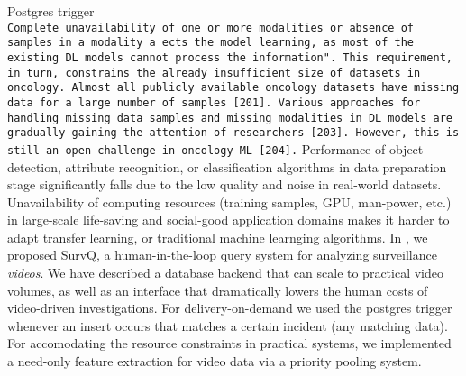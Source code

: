Postgres trigger \\
\texttt{Complete unavailability of one or more modalities or absence of samples in a modality a ects the model learning, as most of the existing DL models cannot process the \missing information". This requirement, in turn, constrains the already insufficient size of datasets in oncology. Almost all publicly available oncology datasets have missing data for a large number of samples [201]. Various approaches for handling missing data samples and missing modalities in DL models are gradually gaining the attention of researchers [203]. However, this is still an open challenge in oncology ML [204].}
Performance of object detection, attribute recognition, or classification algorithms in data preparation stage 
significantly falls due to the 
low quality and noise in real-world datasets. 
Unavailability of computing resources (training samples, GPU, man-power, etc.) in large-scale life-saving and social-good application domains makes it harder to adapt transfer learning, or traditional machine learnging algorithms.
In \cite{stonebraker2020surveillance}, we proposed SurvQ, a human-in-the-loop query system for analyzing surveillance \textit{videos}. We have described a database backend that can scale to practical video volumes, as well as an interface that dramatically lowers the human costs of video-driven investigations. 
For delivery-on-demand we used the postgres trigger whenever an insert occurs that matches a certain incident (any matching data). For accomodating the resource constraints in practical systems, we implemented a need-only 
feature extraction for video data via a priority pooling system. 
